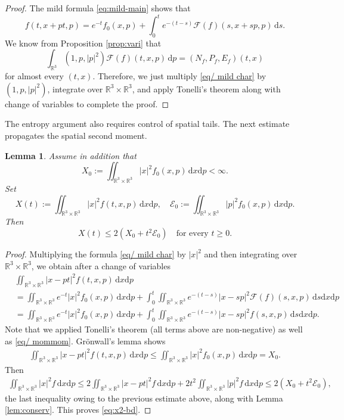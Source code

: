 \documentclass[10pt,reqno]{amsart}
\numberwithin{equation}{section}
\newtheorem{lemma}{Lemma}[section]
\theoremstyle{definition}
\newcommand{\R}{\mathbb R}
\newcommand{\dd}{\mathrm d}
\newcommand{\dx}{\mathrm{d}x}
\newcommand{\dpp}{\mathrm{d}p}
\newcommand{\calE}{\mathcal E}
\newcommand{\calF}{\mathcal F}
\newcommand{\bq}{\begin{equation}}
\newcommand{\eq}{\end{equation}}
\begin{document}
\begin{proof}
 The mild formula \eqref{eq:mild-main} shows that
\begin{equation}\label{eq/ mild char}
		f(t,x+pt,p) = e^{-t} f_0(x,p) + \int_0^t e^{-(t-s)} \calF(f)(s,x+sp,p) \, \dd s.
\end{equation}
		We know from Proposition \ref{prop:vari} that
		\bq \label{eq/ mommom}
		\int_{\R^3}(1,p,|p|^2)\calF(f)(t,x,p)\,\dpp  =(N_f,P_f,E_f)(t,x)
		\eq
for almost every $(t,x)$. Therefore, we just multiply \eqref{eq/ mild char} by $(1,p,|p|^2)$, integrate over $\R^3\times\R^3$, and apply Tonelli's theorem along with change of variables to complete the proof.
\end{proof}

The entropy argument also requires control of spatial tails.  The next estimate propagates the spatial second moment.


\begin{lemma}\label{lem:x2-propa}
Assume in addition that
\[
 X_0:=\iint_{\R^3\times\R^3}|x|^2f_0(x,p)\,\dx\dpp<\infty.
\]
Set
\[
 X(t):=\iint_{\R^3\times\R^3}|x|^2f(t,x,p)\,\dx\dpp,  \quad  \calE_0:=\iint_{\R^3\times\R^3}|p|^2f_0(x,p)\,\dx\dpp.
\]
Then
\bq \label{eq:x2-bd}
 X(t) \leq 2(X_0 + t^2\calE_0) \quad\text{for every }t\geq0.
\eq
\end{lemma}

\begin{proof}
Multiplying the formula \eqref{eq/ mild char} by $|x|^2$ and then integrating over $\R^3\times\R^3$, we obtain after a change of variables
\begin{align*}
    &\iint_{\R^3\times\R^3} |x-pt|^2 f(t,x,p) \, \dx \dpp\\
    &= \iint_{\R^3\times\R^3} e^{-t} |x|^2 f_0(x,p) \, \dx \dpp + \int_0^t \iint_{\R^3\times\R^3} e^{-(t-s)} |x-sp|^2 \calF(f)(s,x,p) \, \dd s \dx \dpp \\
    &= \iint_{\R^3\times\R^3} e^{-t} |x|^2 f_0(x,p) \, \dx \dpp + \int_0^t \iint_{\R^3\times\R^3} e^{-(t-s)} |x-sp|^2 f(s,x,p) \, \dd s \dx \dpp.
\end{align*}
Note that we applied Tonelli's theorem (all terms above are non-negative) as well as \eqref{eq/ mommom}. Gr\"onwall's lemma shows
\begin{align*}
    \iint_{\R^3\times\R^3} |x-pt|^2 f(t,x,p) \, \dx \dpp \le \iint_{\R^3\times\R^3} |x|^2 f_0(x,p) \, \dx \dpp = X_0.
\end{align*}
Then
\begin{align*}
    \iint_{\R^3\times\R^3}|x|^2 f \, \dx \dpp \le 2\iint_{\R^3\times\R^3}|x-pt|^2 f \, \dx \dpp + 2t^2 \iint_{\R^3\times\R^3}|p|^2 f \, \dx \dpp \le 2(X_0 + t^2 \calE_0),
\end{align*}
the last inequality owing to the previous estimate above, along with Lemma \ref{lem:conserv}. This proves \eqref{eq:x2-bd}.
\end{proof}
\end{document}
